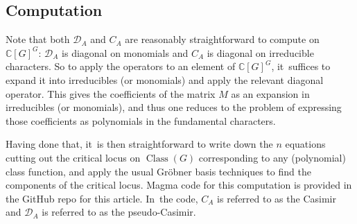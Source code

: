\documentclass[JEP,XML,SOM,Unicode,NoFloatCountersInSection,published]{cedram}
\theoremstyle{definition}
\newcommand{\C}{\mathbb{C}}
\newcommand{\mcD}{\mathcal{D}}
\DeclareMathOperator{\class}{Class}
\newcommand{\ClG}{\class(G)}
\begin{document}
\subsection*{Computation}
Note that both $\mcD_A$ and $C_A$ are reasonably straightforward to compute
on $\C[G]^G$: $\mcD_A$ is diagonal on monomials and $C_A$ is
diagonal on irreducible characters. So to apply the operators to an
element of $\C[G]^G$, it~suffices to expand it into irreducibles
(or monomials) and apply the relevant diagonal operator. This gives the
coefficients of the matrix $M$ as an expansion in irreducibles (or
monomials), and thus one reduces to the problem of expressing those
coefficients as polynomials in the fundamental characters.

Having done that, it~is then straightforward to write down the $n$
equations cutting out the critical locus on $\ClG$ corresponding to any
(polynomial) class function, and apply the usual Gröbner basis
techniques to find the components of the critical locus. Magma code for
this computation is provided in the GitHub repo for this article. In~the
code, $C_A$ is referred to as the Casimir and $\mcD_A$ is referred to as
the pseudo-Casimir.
\end{document}
